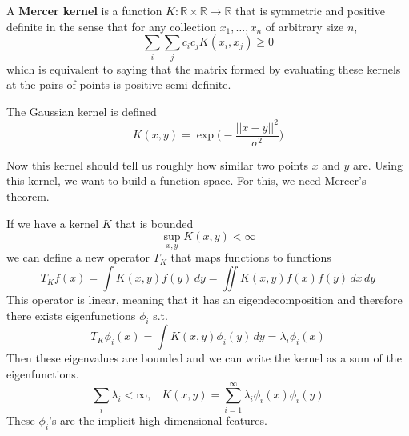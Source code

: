 \documentclass{article}
\begin{document}
  \begin{definition}
    A \textbf{Mercer kernel} is a function $K: \mathbb{R} \times \mathbb{R} \rightarrow \mathbb{R}$ that is symmetric and positive definite in the sense that for any collection $x_1, \ldots, x_n$ of arbitrary size $n$, 
    \begin{equation}
      \sum_i \sum_j c_i c_j K(x_i, x_j) \geq 0 
    \end{equation}
    which is equivalent to saying that the matrix formed by evaluating these kernels at the pairs of points is positive semi-definite. 
  \end{definition}

  \begin{example}
    The Gaussian kernel is defined 
    \begin{equation}
      K(x, y) = \exp \bigg( - \frac{||x - y||^2}{\sigma^2} \bigg)
    \end{equation}
  \end{example} 

  Now this kernel should tell us roughly how similar two points $x$ and $y$ are. Using this kernel, we want to build a function space. For this, we need Mercer's theorem. 

  \begin{theorem}
    If we have a kernel $K$ that is bounded 
    \begin{equation}
      \sup_{x, y} K(x, y) < \infty
    \end{equation}
    we can define a new operator $T_K$ that maps functions to functions
    \begin{equation}
      T_K f(x) =  \int K(x, y) f(y) \,dy = \iint K(x, y) f(x) f(y) \,dx\,dy
    \end{equation}
    This operator is linear, meaning that it has an eigendecomposition and therefore there exists eigenfunctions $\phi_i$ s.t. 
    \begin{equation}
      T_K \phi_i (x) = \int K(x, y) \phi_i(y) \,dy = \lambda_i \phi_i(x)
    \end{equation}
    Then these eigenvalues are bounded and we can write the kernel as a sum of the eigenfunctions. 
    \begin{equation}
      \sum_i \lambda_i < \infty, \;\;\; K(x, y) = \sum_{i=1}^\infty \lambda_i \phi_i(x) \phi_i(y)
    \end{equation}
    These $\phi_i$'s are the implicit high-dimensional features. 
  \end{theorem}
\end{document}

